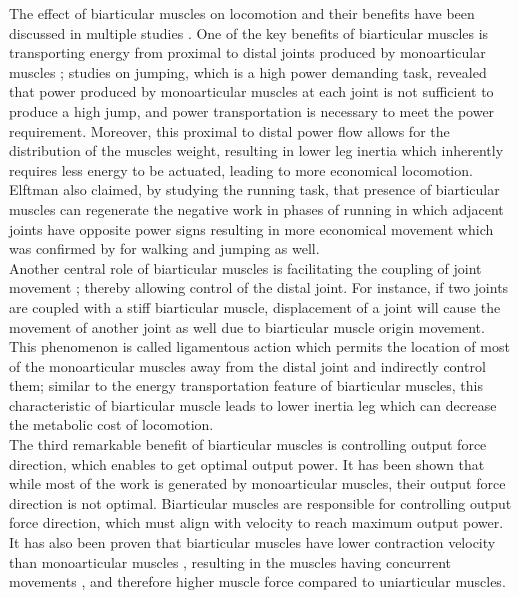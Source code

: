 \documentclass[10pt,letterpaper]{article}
\begin{document}
The effect of biarticular muscles on locomotion and their benefits have been discussed in multiple studies \cite{51,53,57,63}. One of the key benefits of biarticular muscles is transporting energy from proximal to distal joints produced by monoarticular muscles \cite{51,58,59,60,61,62}; studies on jumping, which is a high power demanding task, revealed that power produced by monoarticular muscles at each joint is not sufficient to produce a high jump\cite{58}, and power transportation is necessary to meet the power requirement\cite{58}. Moreover, this proximal to distal power flow allows for the distribution of the muscles weight, resulting in lower leg inertia \cite{62} which inherently requires less energy to be actuated, leading to more economical locomotion\cite{62,53}. Elftman\cite{64} also claimed, by studying the running task, that presence of biarticular muscles can regenerate the negative work in phases of running in which adjacent joints have opposite power signs resulting in more economical movement \cite{65} which was confirmed by \cite{66} for walking and jumping as well. \\
Another central role of biarticular muscles is facilitating the coupling of joint movement \cite{53,57}; thereby allowing control of the distal joint. For instance, if two joints are coupled with a stiff biarticular muscle, displacement of a joint will cause the movement of another joint as well due to biarticular muscle origin movement\cite{57}. This phenomenon is called ligamentous action \cite{67} which permits the location of most of the monoarticular muscles away from the distal joint and indirectly control them\cite{57}; similar to the energy transportation feature of biarticular muscles, this characteristic of biarticular muscle leads to lower inertia leg \cite{57,67} which can decrease the metabolic cost of locomotion.\\
The third remarkable benefit of biarticular muscles is controlling output force direction, which enables to get optimal output power. It has been shown that while most of the work is generated by monoarticular muscles, their output force direction is not optimal\cite{53}. Biarticular muscles are responsible for controlling output force direction\cite{53}, which must align with velocity to reach maximum output power\cite{53}. It has also been proven that biarticular muscles have lower contraction velocity than monoarticular muscles \cite{57}, resulting in the muscles having concurrent movements \cite{68}, and therefore higher muscle force compared to uniarticular muscles\cite{53}. \\
\end{document}
